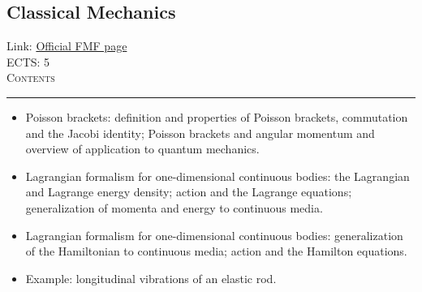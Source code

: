 \documentclass[11pt, a4paper]{article}
\newenvironment{course}[3]{
\subsection{#1}%
Link: \href{#2}{Official FMF page}\\%
ECTS: #3%
\vspace{1ex}
\\
{\large \textsc{Contents}}\\[-0.9ex]%
\rule{\textwidth}{0.5pt}
\vspace{-3ex}
}
{}
\newenvironment{chapter}[1]{
\begin{tcolorbox}[title=#1, breakable]
}
{\end{tcolorbox}}
\begin{document}
\begin{course}{Classical Mechanics}{https://www.fmf.uni-lj.si/en/study-physics/programmes/1fiz/2020/7000777/courses/1155/}{5}
\begin{chapter}{Hamiltonian mechanics}
\begin{itemize}
            \item Poisson brackets: definition and properties of Poisson brackets, commutation and the Jacobi identity; Poisson brackets and angular momentum and overview of application to quantum mechanics.

        \end{itemize}
    \end{chapter}

    \begin{chapter}{Introduction to continuum mechanics}
        \begin{itemize}
        
            \item Lagrangian formalism for one-dimensional continuous bodies: the Lagrangian and Lagrange energy density; action and the Lagrange equations; generalization of momenta and energy to continuous media.

            \item Lagrangian formalism for one-dimensional continuous bodies: generalization of the Hamiltonian to continuous media; action and the Hamilton equations.

            \item Example: longitudinal vibrations of an elastic rod.

        \end{itemize}
    \end{chapter}
\end{course}
\end{document}
